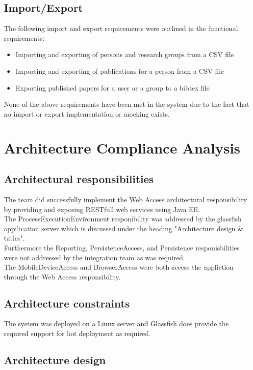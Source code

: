 \documentclass[a4paper,10pt]{article}
\begin{document}
\subsection{Import/Export}
The following import and export requirements were outlined in the functional requirements:
\begin{itemize}
	\item Importing and exporting of persons and research groups from a CSV file
	\item Importing and exporting of publications for a person from a CSV file
	\item Exporting published papers for a user or a group to a bibtex file
\end{itemize}

None of the above requirements have been met in the system due to the fact that no import or export implementation or mocking exists.

\section{Architecture Compliance Analysis}

\subsection{Architectural responsibilities}
The team did successfully implement the Web Access architectural responsibility by providing and exposing RESTfull web services using Java EE. \\
The ProcessExecutionEnvironment responibility was addressed by the glassfish appilication server which is discussed under the heading "Architecture design \& tatics". \\
Furthermore the Reporting, PersistenceAccess, and Persistence responisbilities were not addressed by the integration team as was required. \\
The MobileDeviceAccess and BrowserAccess were both access the appliction through the Web Access responsibility.

\subsection{Architecture constraints}
The system was deployed on a Linux server and Glassfish does provide the required support for hot deployment as required.

\subsection{Architecture design}
\end{document}
